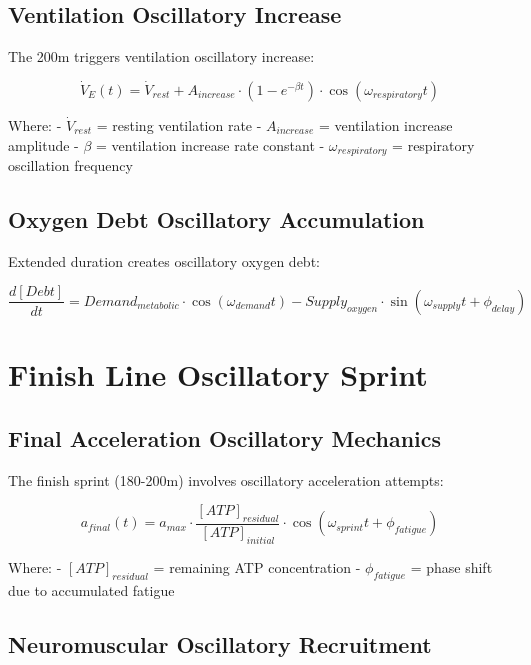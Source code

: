 \documentclass[12pt]{article}
\begin{document}
\subsection{Ventilation Oscillatory Increase}

The 200m triggers ventilation oscillatory increase:

\begin{equation}
\dot{V}_E(t) = \dot{V}_{rest} + A_{increase} \cdot \left(1 - e^{-\beta t}\right) \cdot \cos(\omega_{respiratory}t)
\end{equation}

Where:
- $\dot{V}_{rest}$ = resting ventilation rate
- $A_{increase}$ = ventilation increase amplitude
- $\beta$ = ventilation increase rate constant
- $\omega_{respiratory}$ = respiratory oscillation frequency

\subsection{Oxygen Debt Oscillatory Accumulation}

Extended duration creates oscillatory oxygen debt:

\begin{equation}
\frac{d[Debt]}{dt} = Demand_{metabolic} \cdot \cos(\omega_{demand}t) - Supply_{oxygen} \cdot \sin(\omega_{supply}t + \phi_{delay})
\end{equation}

\section{Finish Line Oscillatory Sprint}

\subsection{Final Acceleration Oscillatory Mechanics}

The finish sprint (180-200m) involves oscillatory acceleration attempts:

\begin{equation}
a_{final}(t) = a_{max} \cdot \frac{[ATP]_{residual}}{[ATP]_{initial}} \cdot \cos(\omega_{sprint}t + \phi_{fatigue})
\end{equation}

Where:
- $[ATP]_{residual}$ = remaining ATP concentration
- $\phi_{fatigue}$ = phase shift due to accumulated fatigue

\subsection{Neuromuscular Oscillatory Recruitment}
\end{document}

